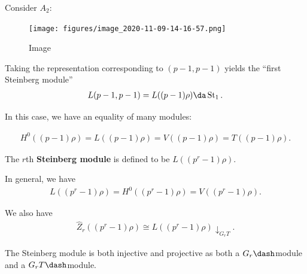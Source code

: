 \begin{example}[Steinberg]

Consider \(A_2\):

\begin{figure}
\centering
\texttt{[image: figures/image\_2020-11-09-14-16-57.png]}
\caption{Image}
\end{figure}

Taking the representation corresponding to \((p-1, p-1)\) yields the
``first Steinberg module''
\begin{align*}  
L(p-1, p-1) = L((p-1)\rho) \da \operatorname{St}_1 
.\end{align*}

In this case, we have an equality of many modules:

\begin{align*}  
H^0((p-1) \rho) =
L((p-1) \rho) =
V((p-1) \rho) =
T((p-1) \rho)
.\end{align*}

\end{example}

\begin{definition}

The \(r\)th \textbf{Steinberg module} is defined to be
\(L((p^r-1)\rho)\).

\end{definition}

\begin{remark}

In general, we have
\begin{align*}  
L((p^r-1)\rho) = 
H^0((p^r-1)\rho) = 
V((p^r-1)\rho)
.\end{align*}

We also have
\begin{align*}  
\hat{Z}_r((p^r-1)\rho) \cong
L((p^r-1)\rho) \downarrow_{G_r T}
.\end{align*}

\end{remark}

\begin{theorem}[?]

The Steinberg module is both injective and projective as both a
\(G_r\dash\)module and a \(G_rT\dash\)module.

\end{theorem}

